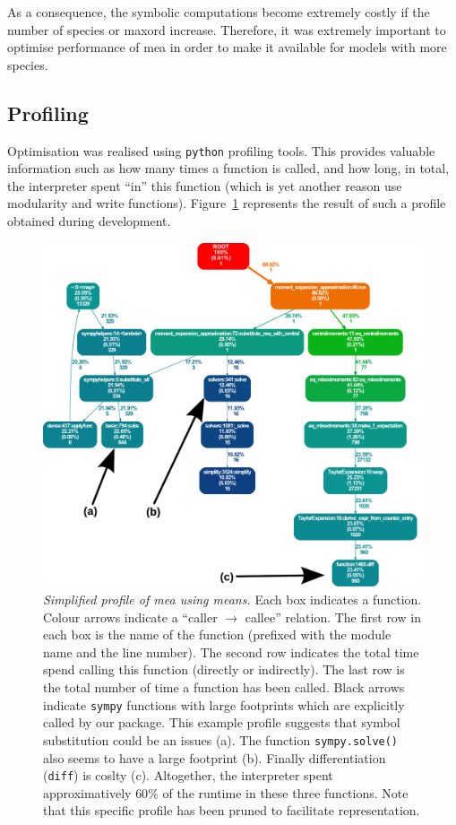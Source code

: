 \documentclass[11pt,a4paper]{article}
\newcommand{\py}{\texttt{python}}
\newcommand{\sympy}{\texttt{sympy}}
\begin{document}
As a consequence, the symbolic computations become extremely costly if the number of species or \gls{maxord} increase.
Therefore, it was extremely important to optimise performance of \gls{mea} in order to make it available for models with more species.

\subsection{Profiling}
Optimisation was realised using \py{} profiling tools.
This provides valuable information such as how many times a function is called, and how long, in total,
the interpreter spent ``in'' this function (which is yet another reason use modularity and write functions).
Figure~\ref{fig:profile} represents the result of such a profile obtained during development.


\begin{figure}[tbh]
\begin{center}
\includegraphics[width=0.83\textwidth{}]{profile.pdf}
\caption{\emph{Simplified profile of \gls{mea} using means.}
Each box indicates a function.
Colour arrows indicate a ``caller $ \rightarrow $ callee'' relation.
The first row in each box is the name of the function (prefixed with the module name and the line number).
The second row indicates the total time spend calling this function (directly or indirectly).
The last row is the total number of time a function has been called.
Black arrows indicate \sympy{} functions with large footprints which are explicitly called by our package.
This example profile suggests that symbol substitution could be an issues (a).
The function \texttt{sympy.solve()} also seems to have a large footprint (b).
Finally differentiation (\texttt{diff}) is coslty (c).
Altogether, the interpreter spent approximatively $60\%$
of the runtime in these three functions.
Note that this specific profile has been pruned to facilitate representation.
}
\end{center}
\label{fig:profile}
\end{figure}
\end{document}
